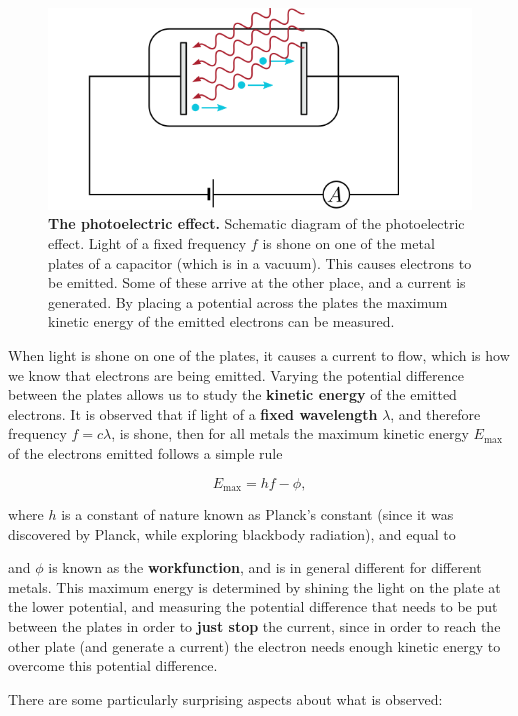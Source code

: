 \documentclass{article}
\begin{document}
\begin{figure}[!htbp]
\centering
\includegraphics[width=0.625\linewidth]{files/photoelectric-8f52e32fc86b631d0381c1bf2e0ba659.svg}
\caption[]{\textbf{The photoelectric effect.} Schematic diagram of the photoelectric effect. Light of a fixed frequency $f$ is shone on one of the metal plates of a capacitor (which is in a vacuum). This causes electrons to be emitted. Some of these arrive at the other place, and a current is generated. By placing a potential across the plates the maximum kinetic energy of the emitted electrons can be measured.}
\label{photoelectric}
\end{figure}

When light is shone on one of the plates, it causes a current to flow, which is how we know that electrons are being emitted. Varying the potential difference between the plates allows us to study the \textbf{kinetic energy} of the emitted electrons. It is observed that if light of a \textbf{fixed wavelength} $\lambda$, and therefore frequency $f = c\lambda$, is shone, then for all metals the maximum kinetic energy $E_\mathrm{max}$ of the electrons emitted follows a simple rule

\begin{equation}
E_\mathrm{max} = h f - \phi,
\end{equation}

where $h$ is a constant of nature known as Planck's constant (since it was discovered by Planck, while exploring blackbody radiation), and equal to

and $\phi$ is known as the \textbf{workfunction}, and is in general different for different metals. This maximum energy is determined by shining the light on the plate at the lower potential, and measuring the potential difference that needs to be put between the plates in order to \textbf{just stop} the current, since in order to reach the other plate (and generate a current) the electron needs enough kinetic energy to overcome this potential difference.

There are some particularly surprising aspects about what is observed:
\end{document}
